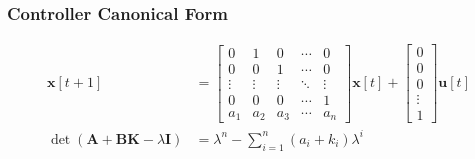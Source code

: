 \documentclass[aspectratio=169]{beamer}
\begin{document}
\begin{frame}
    \frametitle{Controller Canonical Form}

    \begin{align}
        \bm{x}[t + 1] &=
        \begin{bmatrix}
            0 & 1 & 0 & \cdots & 0 \\
            0 & 0 & 1 & \cdots & 0 \\
            \vdots & \vdots & \vdots & \ddots & \vdots \\
            0 & 0 & 0 & \cdots & 1 \\
            a_1 & a_2 & a_3 & \cdots & a_n
        \end{bmatrix} \bm{x}[t] +
        \begin{bmatrix}
            0 \\
            0 \\
            0 \\
            \vdots \\
            1
        \end{bmatrix} \bm{u}[t] \\
        \det(\bm{A} + \bm{BK} - \lambda \bm{I}) &= \lambda^n - \sum_{i = 1}^n (a_i + k_i) \lambda^i
    \end{align}
\end{frame}
\end{document}
